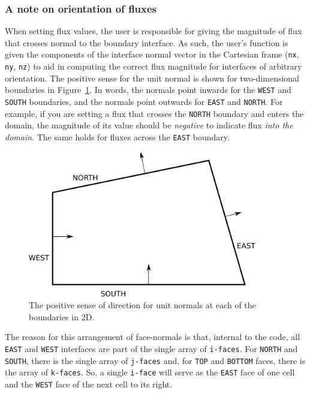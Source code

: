 \subsubsection*{A note on orientation of fluxes}
When setting flux values, the user is responsible for giving the magnitude
of flux that crosses normal to the boundary interface.
As such, the user's function is given the components of the
interface normal vector in the Cartesian frame
(\texttt{nx}, \texttt{ny}, \texttt{nz}) to aid in computing the
correct flux magnitude for interfaces of arbitrary orientation.
The positive sense for the unit normal is shown for two-dimensional
boundaries in Figure~\ref{fig:boundary-normals}.
In words, the normals point inwards for the \texttt{WEST} and \texttt{SOUTH}
boundaries, and the normals point outwards for \texttt{EAST} and \texttt{NORTH}.
For example, if you are setting a flux that crosses the \texttt{NORTH} boundary
and enters the domain, the magnitude of its value should be \emph{negative} to indicate
flux \emph{into the domain}.
The same holds for fluxes across the \texttt{EAST} boundary.

\begin{figure}[htbp]
\begin{center}
\includegraphics[width=10cm]{figs/boundary-normals.pdf}
\end{center}
\caption{The positive sense of direction for unit normals at each of the boundaries in 2D.}
\label{fig:boundary-normals}
\end{figure}

\medskip
The reason for this arrangement of face-normals is that, internal to the code, all \texttt{EAST}
and \texttt{WEST} interfaces are part of the single array of \texttt{i-faces}.
For \texttt{NORTH} and \texttt{SOUTH}, there is the single array of \texttt{j-faces} and,
for \texttt{TOP} and \texttt{BOTTOM} faces, there is the array of \texttt{k-faces}.
So, a single \texttt{i-face} will serve as the \texttt{EAST} face of one cell and 
the \texttt{WEST} face of the next cell to its right.


